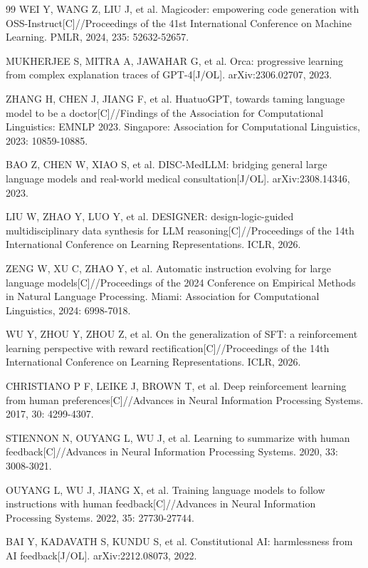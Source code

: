 \documentclass[fontset=fandol,type=master,campus=shenzhen,etitleauto=true]{hithesisbook}
\begin{document}
\begin{thebibliography}{99}
 WEI Y, WANG Z, LIU J, et al. Magicoder: empowering code generation with OSS-Instruct[C]//Proceedings of the 41st International Conference on Machine Learning. PMLR, 2024, 235: 52632-52657.

 MUKHERJEE S, MITRA A, JAWAHAR G, et al. Orca: progressive learning from complex explanation traces of GPT-4[J/OL]. arXiv:2306.02707, 2023.

 ZHANG H, CHEN J, JIANG F, et al. HuatuoGPT, towards taming language model to be a doctor[C]//Findings of the Association for Computational Linguistics: EMNLP 2023. Singapore: Association for Computational Linguistics, 2023: 10859-10885.

 BAO Z, CHEN W, XIAO S, et al. DISC-MedLLM: bridging general large language models and real-world medical consultation[J/OL]. arXiv:2308.14346, 2023.

 LIU W, ZHAO Y, LUO Y, et al. DESIGNER: design-logic-guided multidisciplinary data synthesis for LLM reasoning[C]//Proceedings of the 14th International Conference on Learning Representations. ICLR, 2026.

 ZENG W, XU C, ZHAO Y, et al. Automatic instruction evolving for large language models[C]//Proceedings of the 2024 Conference on Empirical Methods in Natural Language Processing. Miami: Association for Computational Linguistics, 2024: 6998-7018.

 WU Y, ZHOU Y, ZHOU Z, et al. On the generalization of SFT: a reinforcement learning perspective with reward rectification[C]//Proceedings of the 14th International Conference on Learning Representations. ICLR, 2026.

 CHRISTIANO P F, LEIKE J, BROWN T, et al. Deep reinforcement learning from human preferences[C]//Advances in Neural Information Processing Systems. 2017, 30: 4299-4307.

 STIENNON N, OUYANG L, WU J, et al. Learning to summarize with human feedback[C]//Advances in Neural Information Processing Systems. 2020, 33: 3008-3021.

 OUYANG L, WU J, JIANG X, et al. Training language models to follow instructions with human feedback[C]//Advances in Neural Information Processing Systems. 2022, 35: 27730-27744.

 BAI Y, KADAVATH S, KUNDU S, et al. Constitutional AI: harmlessness from AI feedback[J/OL]. arXiv:2212.08073, 2022.


\end{thebibliography}
\end{document}
